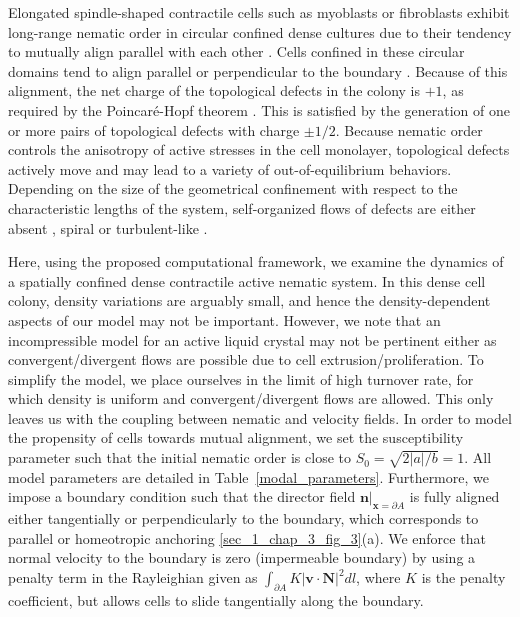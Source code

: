 Elongated spindle-shaped contractile cells such as myoblasts or fibroblasts exhibit long-range nematic order in circular confined dense cultures \cite{duclos2014,guillamat2020} due to their tendency to mutually align parallel with each other \cite{elsdale1968}. Cells confined in these circular domains tend to align parallel or perpendicular to the boundary \cite{guillamat2020}.
Because of this alignment, the net charge of the topological defects in the colony is $+1$, as required by the Poincar\'{e}-Hopf theorem \cite{jubin2009}. This is satisfied by the generation of one or more pairs of topological defects with charge $\pm 1/2$.
Because nematic order controls the anisotropy of active stresses in the cell monolayer, topological defects actively move and may lead to a variety of out-of-equilibrium behaviors. 
Depending on the size of the geometrical confinement with respect to the characteristic lengths of the system, self-organized flows of defects are either absent \cite{duclos2014}, spiral or turbulent-like \cite{norton2018}. 

Here, using the proposed computational framework, we examine the dynamics of a spatially confined dense contractile active nematic system. In this dense cell colony, density variations are arguably small, and hence the density-dependent aspects of our model may not be important. However, we note that an incompressible model for an active liquid crystal may not be pertinent either as convergent/divergent flows are possible due to cell extrusion/proliferation. To simplify the model, we place ourselves in the limit of high turnover rate, for which density is uniform and convergent/divergent flows are allowed. This only leaves us with the coupling between nematic and velocity fields. In order to model the propensity of cells towards mutual alignment, we set the susceptibility parameter such that the initial nematic order is close to $S_0=\sqrt{2|a|/b}=1$. All model parameters are detailed in Table~\ref{modal_parameters}. Furthermore, we impose a boundary condition such that the director field  $\bm{n}|_{\bm{x}=\partial A}$ is fully aligned either tangentially or perpendicularly to the boundary, which corresponds to parallel or homeotropic anchoring  \ref{sec_1_chap_3_fig_3}(a). We enforce that normal velocity to the boundary is zero (impermeable boundary) by using a penalty term in the Rayleighian given as  $\int_{\partial A} K \left|\bm{v} \cdot \bm{N}\right|^2 dl$, where $K$ is the penalty coefficient, but allows cells to slide tangentially along the boundary.

